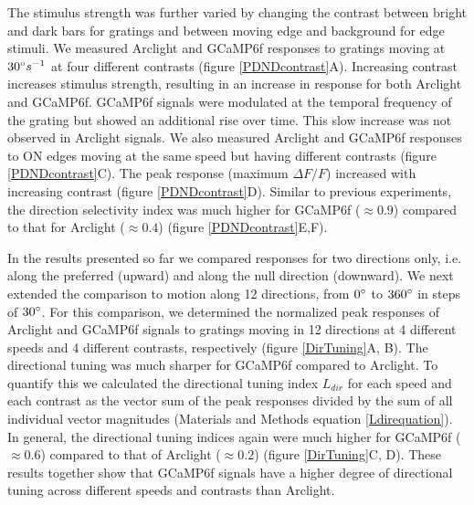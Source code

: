\documentclass[9pt,lineno]{elife}
\begin{document}
The stimulus strength was further varied by changing the contrast between bright and dark bars for gratings and between moving edge and background for edge stimuli. We measured Arclight and GCaMP6f responses to gratings moving at $30\degree s^{-1}$ at four different contrasts (figure \ref{PDNDcontrast}A). Increasing contrast increases stimulus strength, resulting in an increase in response for both Arclight and GCaMP6f. GCaMP6f signals were modulated at the temporal frequency of the grating but showed an additional rise over time. This slow increase was not observed in Arclight signals. We also measured Arclight and GCaMP6f responses to ON edges moving at the same speed but having different contrasts (figure \ref{PDNDcontrast}C). The peak response (maximum $\Delta F/F$) increased with increasing contrast (figure \ref{PDNDcontrast}D). Similar to previous experiments, the direction selectivity index was much higher for GCaMP6f ($\approx0.9$) compared to that for Arclight ($\approx0.4$) (figure \ref{PDNDcontrast}E,F). 

In the results presented so far we compared responses for two directions only, i.e. along the preferred (upward) and along the null direction (downward). We next extended the comparison to motion along 12 directions, from $0\degree$ to $360\degree$ in steps of $30\degree$. For this comparison, we determined the normalized peak responses of Arclight and GCaMP6f signals to gratings moving in 12 directions at 4 different speeds and 4 different contrasts, respectively (figure \ref{DirTuning}A, B). The directional tuning was much sharper for GCaMP6f compared to Arclight. To quantify this we calculated the directional tuning index $L_{dir}$ \parencite{Mazurek2014} for each speed and each contrast as the vector sum of the peak responses divided by the sum of all individual vector magnitudes (Materials and Methods equation \eqref{Ldirequation}). In general, the directional tuning indices again were much higher for GCaMP6f ($\approx0.6$) compared to that of Arclight ($\approx0.2$) (figure \ref{DirTuning}C, D). These results together show that GCaMP6f signals have a higher degree of directional tuning across different speeds and contrasts than Arclight.
\end{document}

